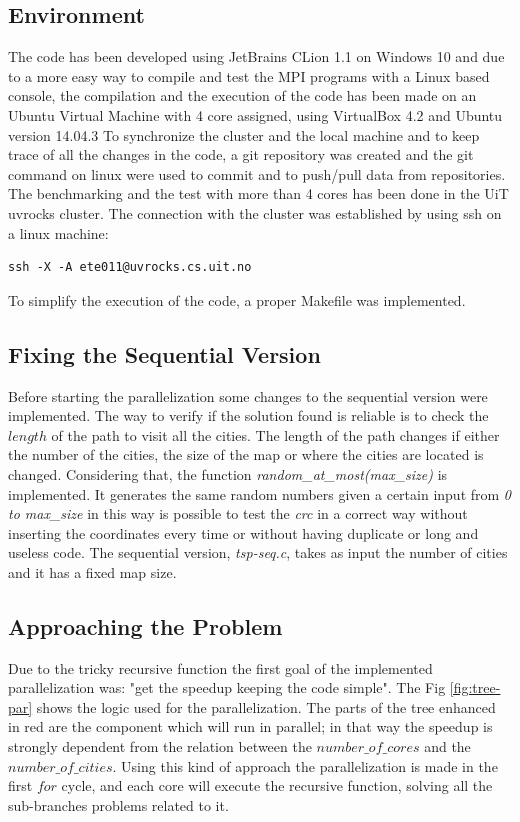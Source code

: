 \documentclass[11pt,conference]{IEEEtran}
\begin{document}
\subsection{Environment}
The code has been developed using JetBrains CLion 1.1 on Windows 10 and due to a more easy way to compile and test the MPI programs with a Linux based console, the compilation and the execution of the code has been made on an Ubuntu Virtual Machine with 4 core assigned, using VirtualBox 4.2 and Ubuntu version 14.04.3
\newline
To synchronize the cluster and the local machine and to keep trace of all the changes in the code, a git repository was created and the git command on linux were used to commit and to push/pull data from repositories.
\newline
The benchmarking and the test with more than 4 cores has been done in the UiT uvrocks cluster. The connection with the cluster was established by using ssh on a linux machine:
\begin{lstlisting}
ssh -X -A ete011@uvrocks.cs.uit.no
\end{lstlisting}
To simplify the execution of the code, a proper Makefile was implemented.

\subsection{Fixing the Sequential Version}
Before starting the parallelization some changes to the sequential version were implemented. The way to verify if the solution found is reliable is to check the $length$ of the path to visit all the cities. The length of the path changes if either the number of the cities, the size of the map or where the cities are located is changed. Considering that, the function \textit{random\_at\_most(max\_size)} is implemented. It generates the same random numbers given a certain input from \textit{0 to max\_size} in this way is possible to test the \textit{crc} in a correct way without inserting the coordinates every time or without having duplicate or long and useless code.
The sequential version, \textit{tsp-seq.c}, takes as input the number of cities and it has a fixed map size.

\subsection{Approaching the Problem}
Due to the tricky recursive function the first goal of the implemented parallelization was: "get the speedup keeping the code simple". 
The Fig \ref{fig:tree-par} shows the logic used for the parallelization. The parts of the tree enhanced in red are the component which will run in parallel; in that way the speedup is strongly dependent from the relation between the $number\_of\_cores$ and the $number\_of\_cities$. Using this kind of approach the parallelization is made in the first $for$ cycle, and each core will execute the recursive function, solving all the sub-branches problems related to it.
\end{document}
